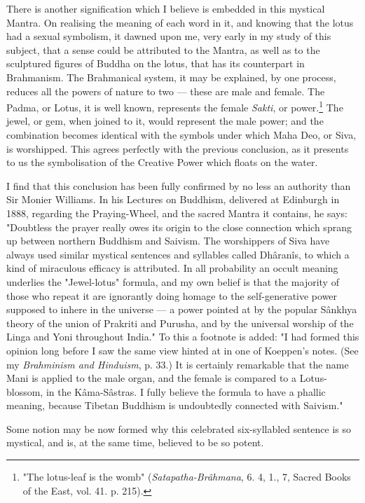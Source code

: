\documentclass[a4paper, 11pt, oneside, polutonikogreek, english]{article}
\begin{document}
There is another signification which I believe is embedded in this mystical Mantra. On realising the meaning of each word in it, and knowing that the lotus had a sexual symbolism, it dawned upon me, very early in my study of this subject, that a sense could be attributed to the Mantra, as well as to the sculptured figures of Buddha on the lotus, that has its counterpart in Brahmanism. The Brahmanical system, it may be explained, by one process, reduces all the powers of nature to two --- these are male and female. The Padma, or Lotus, it is well known, represents the female \emph{Sakti}, or power.\footnote{"The lotus-leaf is the womb" (\emph{Satapatha-Brâhmana}, 6. 4, 1., 7, Sacred Books of the East, vol. 41. p. 215).} The jewel, or gem, when joined to it, would represent the male power; and the combination becomes identical with the symbols under which Maha Deo, or Siva, is worshipped. This agrees perfectly with the previous conclusion, as it presents to us the symbolisation of the Creative Power which floats on the water.

I find that this conclusion has been fully confirmed by no less an authority than Sir Monier Williams. In his Lectures on Buddhism, delivered at Edinburgh in 1888, regarding the Praying-Wheel, and the sacred Mantra it contains, he says: "Doubtless the prayer really owes its origin to the close connection which sprang up between northern Buddhism and Saivism. The worshippers of Siva have always used similar mystical sentences and syllables called Dhâranîs, to which a kind of miraculous efficacy is attributed. In all probability an occult meaning underlies the "Jewel-lotus" formula, and my own belief is that the majority of those who repeat it are ignorantly doing homage to the self-generative power supposed to inhere in the universe --- a power pointed at by the popular Sânkhya theory of the union of Prakriti and Purusha, and by the universal worship of the Linga and Yoni throughout India." To this a footnote is added: "I had formed this opinion long before I saw the same view hinted at in one of Koeppen's notes. (See my \emph{Brahminism and Hinduism}, p. 33.) It is certainly remarkable that the name Mani is applied to the male organ, and the female is compared to a Lotus-blossom, in the Kâma-Sâstras. I fully believe the formula to have a phallic meaning, because Tibetan Buddhism is undoubtedly connected with Saivism."

Some notion may be now formed why this celebrated six-syllabled sentence is so mystical, and is, at the same time, believed to be so potent.
\clearpage
\end{document}
